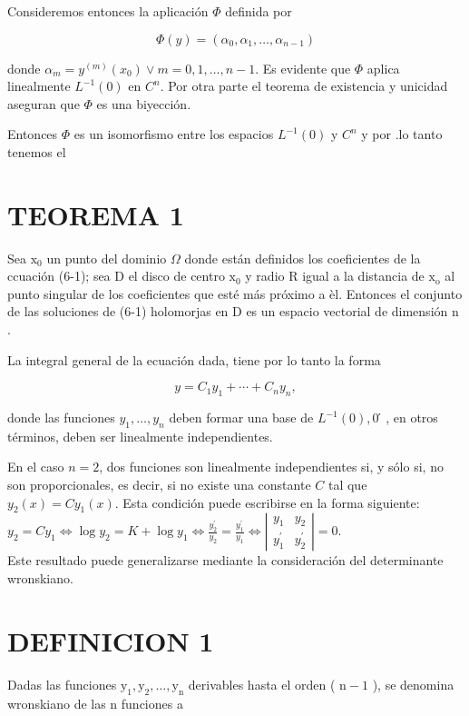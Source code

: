 \documentclass[10pt]{article}
\theoremstyle{plain}
\theoremstyle{definition}
\theoremstyle{remark}
\begin{document}
Consideremos entonces la aplicación $\Phi$ definida por

$$
\Phi(y)=\left(\alpha_{0}, \alpha_{1}, \ldots, \alpha_{n-1}\right)
$$

donde $\alpha_{m}=y^{(m)}\left(x_{0}\right) \vee m=0,1, \ldots, n-1$. Es evidente que $\Phi$ aplica linealmente $L^{-1}(0)$ en $C^{n}$. Por otra parte el teorema de existencia y unicidad aseguran que $\Phi$ es una biyección.

Entonces $\Phi$ es un isomorfismo entre los espacios $L^{-1}(0)$ y $C^{n}$ y por .lo tanto tenemos el

\section*{TEOREMA 1}
Sea $\mathrm{x}_{0}$ un punto del dominio $\Omega$ donde están definidos los coeficientes de la ccuación (6-1); sea D el disco de centro $\mathrm{x}_{0}$ y radio R igual a la distancia de $\mathrm{x}_{\mathrm{o}}$ al punto singular de los coeficientes que esté más próximo a èl. Entonces el conjunto de las soluciones de (6-1) holomorjas en D es un espacio vectorial de dimensión n .

La integral general de la ecuación dada, tiene por lo tanto la forma


\begin{equation*}
y=C_{1} y_{1}+\cdots+C_{n} y_{n}, \tag{6-5}
\end{equation*}


donde las funciones $y_{1}, \ldots, y_{n}$ deben formar una base de $L^{-1}(0), 0 ́$, en otros términos, deben ser linealmente independientes.

En el caso $n=2$, dos funciones son linealmente independientes si, y sólo si, no son proporcionales, es decir, si no existe una constante $C$ tal que $y_{2}(x)=C y_{1}(x)$. Esta condición puede escribirse en la forma siguiente:\\
$y_{2}=C y_{1} \Longleftrightarrow \log y_{2}=K+\log y_{1} \Longleftrightarrow \frac{y_{2}^{\prime}}{y_{2}}=\frac{y_{1}^{\prime}}{y_{1}} \Longleftrightarrow\left|\begin{array}{ll}y_{1} & y_{2} \\ y_{1}^{\prime} & y_{2}^{\prime}\end{array}\right|=0$.\\
Este resultado puede generalizarse mediante la consideración del determinante wronskiano.

\section*{DEFINICION 1}
Dadas las funciones $\mathrm{y}_{1}, \mathrm{y}_{2}, \ldots, \mathrm{y}_{\mathrm{n}}$ derivables hasta el orden ( $\mathrm{n}-1$ ), se denomina wronskiano de las n funciones a
\end{document}
